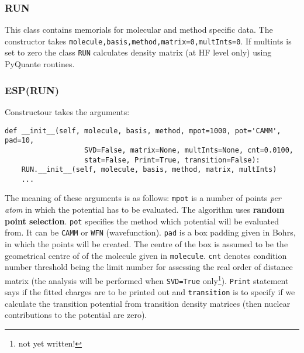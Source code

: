 \documentclass[a4paper,titlepage,twoside,fleqn]{article}
\begin{document}
\subsubsection{RUN}
This class contains memorials for molecular and method specific data.
The constructor takes \verb+molecule,basis,method,matrix=0,multInts=0+. 
If multints is set to zero the class \verb+RUN+ calculates density matrix 
(at HF level only) using PyQuante routines. 

\subsubsection{ESP(RUN)}
Constructour takes the arguments:
\begin{verbatim}
def __init__(self, molecule, basis, method, mpot=1000, pot='CAMM', pad=10, 
                   SVD=False, matrix=None, multInts=None, cnt=0.0100, 
                   stat=False, Print=True, transition=False):
    RUN.__init__(self, molecule, basis, method, matrix, multInts)
    ...
\end{verbatim}
The meaning of these arguments is as follows: \verb+mpot+ is a number 
of points \emph{per atom} in which the potential has to be evaluated.
The algorithm uses {\bf random point selection}. \verb+pot+ specifies
the method which potential will be evaluated from. It can be \verb+CAMM+
or \verb+WFN+ (wavefunction). \verb+pad+ is a box padding given in Bohrs,
in which the points will be created. The centre of the box is assumed to 
be the geometrical centre of of the molecule given in \verb+molecule+.
\verb+cnt+ denotes condition number threshold being the limit number for
assessing the real order of distance matrix (the analysis will be performed
when \verb+SVD=True+ only\footnote{{\color{red}not yet written!}}). 
\verb+Print+ statement says if the fitted charges are to be printed out
and \verb+transition+ is to specify if we calculate the transition potential
from transition density matrices (then nuclear contributions to the potential
are zero).
\end{document}
